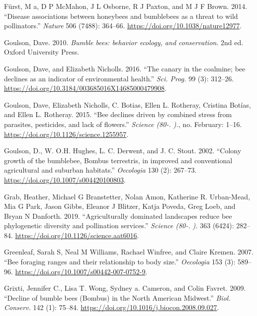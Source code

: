 \documentclass[11pt,]{article}
\begin{document}
\leavevmode\hypertarget{ref-Furst2014}{}%
Fürst, M a, D P McMahon, J L Osborne, R J Paxton, and M J F Brown. 2014.
``Disease associations between honeybees and bumblebees as a threat to
wild pollinators.'' \emph{Nature} 506 (7488): 364--66.
\url{https://doi.org/10.1038/nature12977}.

\leavevmode\hypertarget{ref-Goulson2008}{}%
Goulson, Dave. 2010. \emph{Bumble bees: behavior ecology, and
conservation}. 2nd ed. Oxford University Press.

\leavevmode\hypertarget{ref-Goulson2016}{}%
Goulson, Dave, and Elizabeth Nicholls. 2016. ``The canary in the
coalmine; bee declines as an indicator of environmental health.''
\emph{Sci. Prog.} 99 (3): 312--26.
\url{https://doi.org/10.3184/003685016X14685000479908}.

\leavevmode\hypertarget{ref-Goulson2015c}{}%
Goulson, Dave, Elizabeth Nicholls, C. Botias, Ellen L. Rotheray,
Cristina Botías, and Ellen L. Rotheray. 2015. ``Bee declines driven by
combined stress from parasites, pesticides, and lack of flowers.''
\emph{Science (80-. ).}, no. February: 1--16.
\url{https://doi.org/10.1126/science.1255957}.

\leavevmode\hypertarget{ref-Goulson2002c}{}%
Goulson, D., W. O.H. Hughes, L. C. Derwent, and J. C. Stout. 2002.
``Colony growth of the bumblebee, Bombus terrestris, in improved and
conventional agricultural and suburban habitats.'' \emph{Oecologia} 130
(2): 267--73. \url{https://doi.org/10.1007/s004420100803}.

\leavevmode\hypertarget{ref-Grab2019}{}%
Grab, Heather, Michael G Branstetter, Nolan Amon, Katherine R.
Urban-Mead, Mia G Park, Jason Gibbs, Eleanor J Blitzer, Katja Poveda,
Greg Loeb, and Bryan N Danforth. 2019. ``Agriculturally dominated
landscapes reduce bee phylogenetic diversity and pollination services.''
\emph{Science (80-. ).} 363 (6424): 282--84.
\url{https://doi.org/10.1126/science.aat6016}.

\leavevmode\hypertarget{ref-Greenleaf2007b}{}%
Greenleaf, Sarah S, Neal M Williams, Rachael Winfree, and Claire Kremen.
2007. ``Bee foraging ranges and their relationship to body size.''
\emph{Oecologia} 153 (3): 589--96.
\url{https://doi.org/10.1007/s00442-007-0752-9}.

\leavevmode\hypertarget{ref-Grixti2009}{}%
Grixti, Jennifer C., Lisa T. Wong, Sydney a. Cameron, and Colin Favret.
2009. ``Decline of bumble bees (Bombus) in the North American Midwest.''
\emph{Biol. Conserv.} 142 (1): 75--84.
\url{https://doi.org/10.1016/j.biocon.2008.09.027}.
\end{document}
